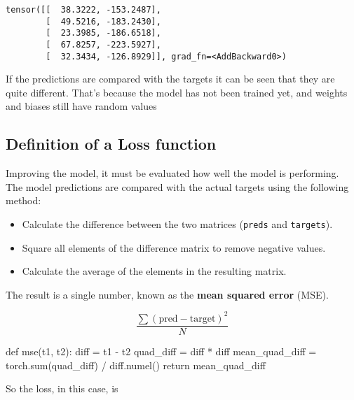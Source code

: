 \documentclass[
  letterpaper,
  DIV=11,
  numbers=noendperiod]{scrartcl}
\newenvironment{Shaded}{\begin{snugshade}}{\end{snugshade}}
\newcommand{\BuiltInTok}[1]{\textcolor[rgb]{0.00,0.23,0.31}{#1}}
\newcommand{\ControlFlowTok}[1]{\textcolor[rgb]{0.00,0.23,0.31}{#1}}
\newcommand{\KeywordTok}[1]{\textcolor[rgb]{0.00,0.23,0.31}{#1}}
\newcommand{\NormalTok}[1]{\textcolor[rgb]{0.00,0.23,0.31}{#1}}
\newcommand{\OperatorTok}[1]{\textcolor[rgb]{0.37,0.37,0.37}{#1}}
\providecommand{\tightlist}{%
  \setlength{\itemsep}{0pt}\setlength{\parskip}{0pt}}\usepackage{longtable,booktabs,array}
\begin{document}
\begin{verbatim}
tensor([[  38.3222, -153.2487],
        [  49.5216, -183.2430],
        [  23.3985, -186.6518],
        [  67.8257, -223.5927],
        [  32.3434, -126.8929]], grad_fn=<AddBackward0>)
\end{verbatim}

If the predictions are compared with the targets it can be seen that
they are quite different. That's because the model has not been trained
yet, and weights and biases still have random values

\hypertarget{definition-of-a-loss-function}{%
\subsection{Definition of a Loss
function}\label{definition-of-a-loss-function}}

Improving the model, it must be evaluated how well the model is
performing. The model predictions are compared with the actual targets
using the following method:

\begin{itemize}
\tightlist
\item
  Calculate the difference between the two matrices (\texttt{preds} and
  \texttt{targets}).
\item
  Square all elements of the difference matrix to remove negative
  values.
\item
  Calculate the average of the elements in the resulting matrix.
\end{itemize}

The result is a single number, known as the \textbf{mean squared error}
(MSE).

\[\frac{\sum{(\text{pred}-\text{target})^{2}}}{N}\]

\begin{Shaded}
\begin{Highlighting}[]
\KeywordTok{def}\NormalTok{ mse(t1, t2):}
\NormalTok{    diff }\OperatorTok{=}\NormalTok{ t1 }\OperatorTok{{-}}\NormalTok{ t2}
\NormalTok{    quad\_diff }\OperatorTok{=}\NormalTok{ diff }\OperatorTok{*}\NormalTok{ diff}
\NormalTok{    mean\_quad\_diff }\OperatorTok{=}\NormalTok{ torch.}\BuiltInTok{sum}\NormalTok{(quad\_diff) }\OperatorTok{/}\NormalTok{ diff.numel()}
    \ControlFlowTok{return}\NormalTok{ mean\_quad\_diff}
\end{Highlighting}
\end{Shaded}

So the loss, in this case, is
\end{document}
